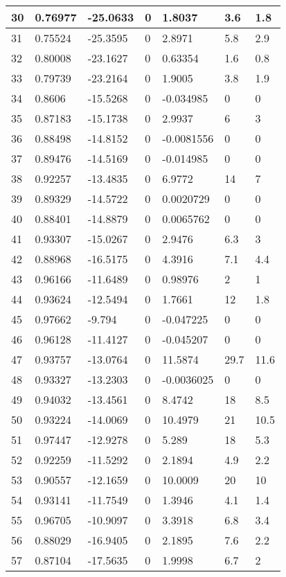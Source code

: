 \begin{tabular}{|l|l|l|l|l|l|l|}
30&0.76977&-25.0633&0&1.8037&3.6&1.8\\\hline
31&0.75524&-25.3595&0&2.8971&5.8&2.9\\\hline
32&0.80008&-23.1627&0&0.63354&1.6&0.8\\\hline
33&0.79739&-23.2164&0&1.9005&3.8&1.9\\\hline
34&0.8606&-15.5268&0&-0.034985&0&0\\\hline
35&0.87183&-15.1738&0&2.9937&6&3\\\hline
36&0.88498&-14.8152&0&-0.0081556&0&0\\\hline
37&0.89476&-14.5169&0&-0.014985&0&0\\\hline
38&0.92257&-13.4835&0&6.9772&14&7\\\hline
39&0.89329&-14.5722&0&0.0020729&0&0\\\hline
40&0.88401&-14.8879&0&0.0065762&0&0\\\hline
41&0.93307&-15.0267&0&2.9476&6.3&3\\\hline
42&0.88968&-16.5175&0&4.3916&7.1&4.4\\\hline
43&0.96166&-11.6489&0&0.98976&2&1\\\hline
44&0.93624&-12.5494&0&1.7661&12&1.8\\\hline
45&0.97662&-9.794&0&-0.047225&0&0\\\hline
46&0.96128&-11.4127&0&-0.045207&0&0\\\hline
47&0.93757&-13.0764&0&11.5874&29.7&11.6\\\hline
48&0.93327&-13.2303&0&-0.0036025&0&0\\\hline
49&0.94032&-13.4561&0&8.4742&18&8.5\\\hline
50&0.93224&-14.0069&0&10.4979&21&10.5\\\hline
51&0.97447&-12.9278&0&5.289&18&5.3\\\hline
52&0.92259&-11.5292&0&2.1894&4.9&2.2\\\hline
53&0.90557&-12.1659&0&10.0009&20&10\\\hline
54&0.93141&-11.7549&0&1.3946&4.1&1.4\\\hline
55&0.96705&-10.9097&0&3.3918&6.8&3.4\\\hline
56&0.88029&-16.9405&0&2.1895&7.6&2.2\\\hline
57&0.87104&-17.5635&0&1.9998&6.7&2\\\hline
\end{tabular}
